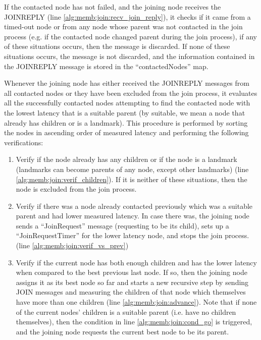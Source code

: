 If the contacted node has not failed, and the joining node receives the JOINREPLY (line \ref{alg:memb:join:recv_join_reply}), it checks if it came from a timed-out node or from any node whose parent was not contacted in the join process (e.g. if the contacted node changed parent during the join process), if any of these situations occurs, then the message is discarded. If none of these situations occurs, the message is not discarded, and the information contained in the JOINREPLY message is stored in the ``contactedNodes'' map.

Whenever the joining node has either received the JOINREPLY messages from all contacted nodes or they have been excluded from the join process, it evaluates all the successfully contacted nodes attempting to find the contacted node with the lowest latency that is a suitable parent (by suitable, we mean a node that already has children or is a landmark). This procedure is performed by sorting the nodes in ascending order of measured latency and performing the following verifications:

\begin{enumerate}
    \item Verify if the node already has any children or if the node is a landmark (landmarks can become parents of any node, except other landmarks) (line \ref{alg:memb:join:verif_children}). If it is neither of these situations, then the node is excluded from the join process. 
    
    \item Verify if there was a node already contacted previously which was a suitable parent and had lower measured latency. In case there was, the joining node sends a ``JoinRequest'' message (requesting to be its child), sets up a ``JoinRequestTimer'' for the lower latency node, and stops the join process. (line \ref{alg:memb:join:verif_vs_prev})

    \item Verify if the current node has both enough children and has the lower latency when compared to the best previous last node. If so, then the joining node assigns it as its best node so far and starts a new recursive step by sending JOIN messages and measuring the children of that node which themselves have more than one children (line \ref{alg:memb:join:advance}). Note that if none of the current nodes' children is a suitable parent (i.e. have no children themselves), then the condition in line \ref{alg:memb:join:cond_go} is triggered, and the joining node requests the current best node to be its parent.
\end{enumerate}

